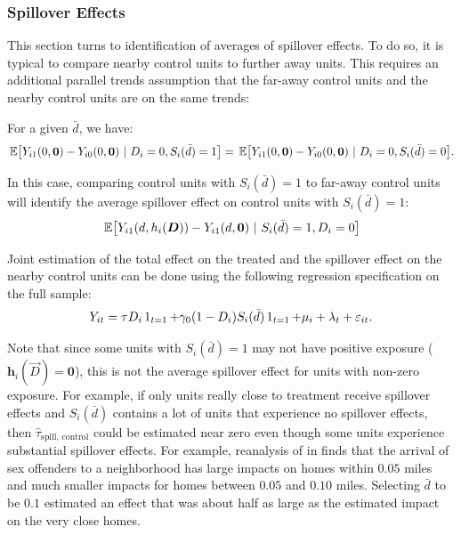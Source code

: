 \subsubsection{Spillover Effects}\label{sec:spill}

This section turns to identification of averages of spillover effects. To do so, it is typical to compare nearby control units to further away units. This  requires an additional parallel trends assumption that the far-away control units and the nearby control units are on the same trends:
\begin{assumption}\label{assumption:parallel-spill}
  For a given $\bar{d}$, we have: 
  \begin{align*}
    \expec{Y_{i1}(0, \bm{0}) - Y_{i0}(0, \bm{0}) \ \vert \ D_i = 0, S_i(\bar{d}) = 1} = 
    \expec{Y_{i1}(0, \bm{0}) - Y_{i0}(0, \bm{0}) \ \vert \ D_i = 0, S_i(\bar{d}) = 0}.
  \end{align*}
\end{assumption}

In this case, comparing control units with $S_i(\bar{d}) = 1$ to far-away control units will identify the average spillover effect on control units with $S_i(\bar{d}) = 1$:
$$
\expec{ Y_{i1}(d, h_i(\bm{D})) - Y_{i1}(d, \bm{0}) }{ S_i(\bar{d}) = 1, D_i = 0}
$$

Joint estimation of the total effect on the treated and the spillover effect on the nearby control units can be done using the following regression specification on the full sample:
\begin{equation}\label{eq:twfe_spill}
  Y_{it} = \tau D_i \one_{t = 1} + \gamma_0 (1 - D_i) S_i(\bar{d}) \one_{t = 1} + \mu_i + \lambda_t + \varepsilon_{it}.
\end{equation}

Note that since some units with $S_i(\bar{d}) = 1$ may not have positive exposure ($\bm{h}_i(\vec{D}) = \bm{0}$), this is not the average spillover effect for units with non-zero exposure. For example, if only units really close to treatment receive spillover effects and $S_i(\bar{d})$ contains a lot of units that experience no spillover effects, then $\hat{\tau}_{\text{spill, control}}$ could be estimated near zero even though some units experience substantial spillover effects. For example, reanalysis of \citet{linden2008estimates} in \citet{butts2023jue} finds that the arrival of sex offenders to a neighborhood has large impacts on homes within $0.05$ miles and much smaller impacts for homes between $0.05$ and $0.10$ miles. Selecting $\bar{d}$ to be $0.1$ estimated an effect that was about half as large as the estimated impact on the very close homes.


